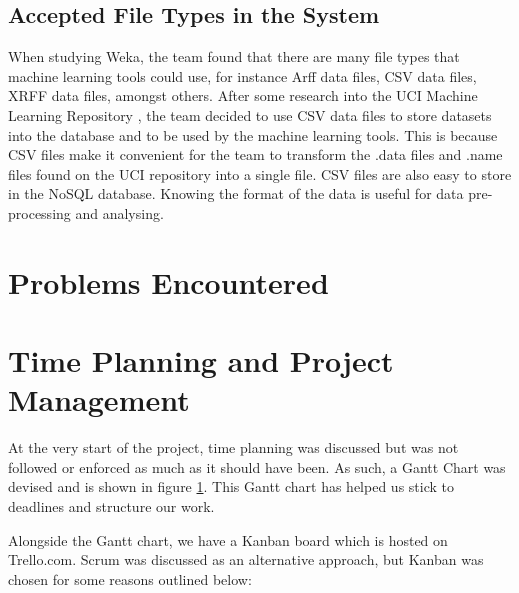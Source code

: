 \documentclass[titlepage]{article}
\begin{document}
\subsection{Accepted File Types in the System}

When studying Weka, the team found that there are many file types that machine learning tools could use, for instance Arff data files, CSV data files, XRFF data files, amongst others. After some research into the UCI Machine Learning Repository \cite{uci}, the team decided to use CSV data files to store datasets into the database and to be used by the machine learning tools. This is because CSV files make it convenient for the team to transform the .data files and .name files found on the UCI repository into a single file. CSV files are also easy to store in the NoSQL database. Knowing the format of the data is useful for data pre-processing and analysing.


\section{Problems Encountered}

\section{Time Planning and Project Management}
At the very start of the project, time planning was discussed but was not followed or enforced as much as it should have been. As such, a Gantt Chart was devised and is shown in figure \ref{ganttchart}. This Gantt chart has helped us stick to deadlines and structure our work.

\begin{figure}\label{ganttchart}
  
\end{figure}

Alongside the Gantt chart, we have a Kanban board which is hosted on Trello.com. Scrum was discussed as an alternative approach, but Kanban was chosen for some reasons outlined below:
\end{document}
